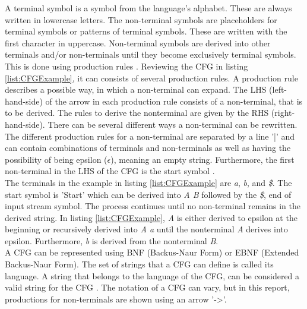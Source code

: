 A terminal symbol is a symbol from the language's alphabet\cite{SPO_Topic_5}. These are always written in lowercase letters. The non-terminal symbols are placeholders for terminal symbols or patterns of terminal symbols. These are written with the first character in uppercase. Non-terminal symbols are derived into other terminals and/or non-terminals until they become exclusively terminal symbols. This is done using production rules \cite{SPO_Topic_5}. Reviewing the CFG in listing \ref{list:CFGExample}, it can consists of several production rules. A production rule describes a possible way, in which a non-terminal can expand. The LHS (left-hand-side) of the arrow in each production rule consists of a non-terminal, that is to be derived. The rules to derive the nonterminal are given by the RHS (right-hand-side). There can be several different ways a non-terminal can be rewritten. The different production rules for a non-terminal are separated by a line '|' and can contain combinations of terminals and non-terminals as well as having the possibility of being epsilon ($\epsilon$), meaning an empty string. Furthermore, the first non-terminal in the LHS of the CFG is the start symbol \cite{SPO_Topic_5}. \\
The terminals in the example in listing \ref{list:CFGExample} are \textit{a}, \textit{b}, and \textit{\$}. The start symbol is 'Start' which can be derived into \textit{A B} followed by the \textit{\$}, end of input stream symbol. The process continues until no non-terminal remains in the derived string. In listing \ref{list:CFGExample}, \textit{A} is either derived to epsilon at the beginning or recursively derived into \textit{A a} until the nonterminal \textit{A} derives into epsilon. Furthermore, \textit{b} is derived from the nonterminal \textit{B}. \\

A CFG can be represented using BNF (Backus-Naur Form) or EBNF (Extended Backus-Naur Form). The set of strings that a CFG can define is called its language. A string that belongs to the language of the CFG, can be considered a valid string for the CFG \cite{SPO_Topic_5}. The notation of a CFG can vary, but in this report, productions for non-terminals are shown using an arrow '->'.

